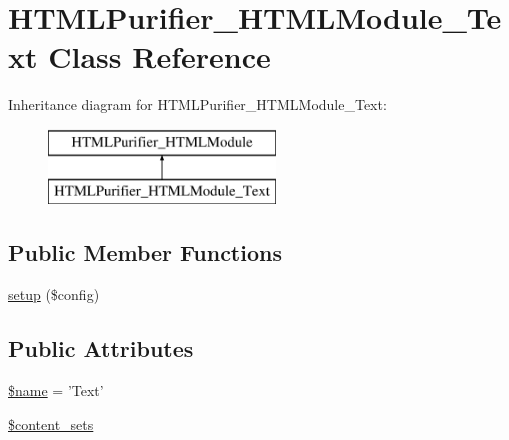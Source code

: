 \hypertarget{classHTMLPurifier__HTMLModule__Text}{\section{H\+T\+M\+L\+Purifier\+\_\+\+H\+T\+M\+L\+Module\+\_\+\+Text Class Reference}
\label{classHTMLPurifier__HTMLModule__Text}
}
Inheritance diagram for H\+T\+M\+L\+Purifier\+\_\+\+H\+T\+M\+L\+Module\+\_\+\+Text\+:\begin{figure}[H]
\begin{center}
\leavevmode
\includegraphics[height=2.000000cm]{classHTMLPurifier__HTMLModule__Text}
\end{center}
\end{figure}
\subsection*{Public Member Functions}
\begin{DoxyCompactItemize}
\item 
\hyperlink{classHTMLPurifier__HTMLModule__Text_acefd53a6073f2b7474375a1e2f6b8163}{setup} (\$config)
\end{DoxyCompactItemize}
\subsection*{Public Attributes}
\begin{DoxyCompactItemize}
\item 
\hyperlink{classHTMLPurifier__HTMLModule__Text_a04cc02d4be360164113d399749c69cc1}{\$name} = 'Text'
\item 
\hyperlink{classHTMLPurifier__HTMLModule__Text_aedeade1f8f771d4090555b0f214b2901}{\$content\+\_\+sets}
\end{DoxyCompactItemize}


